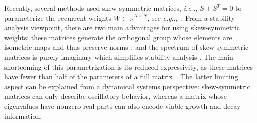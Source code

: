 \documentclass{article} \usepackage{iclr2021_conference,times}
\makeatletter
\DeclareRobustCommand\onedot{\futurelet\@let@token\@onedot}
\def\@onedot{\ifx\@let@token.\else.\null\fi\xspace}
\def\eg{\emph{e.g}\onedot} \def\Eg{\emph{E.g}\onedot}
\def\ie{\emph{i.e}\onedot} \def\Ie{\emph{I.e}\onedot}
\makeatother
\begin{document}
Recently, several methods used skew-symmetric matrices, \ie, $S + S^T = 0$ to parameterize the recurrent weights $W \in \mathbb{R}^{N \times N}$, see \eg,~\citep{wisdom2016full,chang2018antisymmetricrnn}. From a stability analysis viewpoint, there are two main advantages for using skew-symmetric weights: these matrices generate the orthogonal group whose elements are isometric maps and thus preserve norms \citep{lezcano2019cheap}; and the spectrum of skew-symmetric matrices is purely imaginary which simplifies stability analysis \citep{chang2018antisymmetricrnn}.
The main shortcoming of this parametrization is its reduced expressivity, as these matrices have fewer than half of the parameters of a full matrix~\citep{kerg2019non}. The latter limiting aspect can be explained from a dynamical systems perspective: skew-symmetric matrices can only describe oscillatory behavior, whereas a matrix whose eigenvalues have nonzero real parts can also encode viable growth and decay information.
\end{document}
